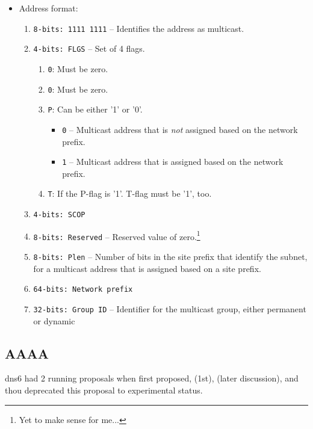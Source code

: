 \begin{itemize}
    \item Address format:\cite{IPv6Addr96:online}
    \begin{enumerate}
        \item \texttt{8-bits: 1111 1111} -- Identifies the address as multicast.
        \item \texttt{4-bits: FLGS} -- Set of 4 flags.
        \begin{enumerate}
            \item \texttt{0}: Must be zero.
            \item \texttt{0}: Must be zero.
            \item \texttt{P}: Can be either '1' or '0'.
            \begin{itemize}
                \item \texttt{0} -- Multicast address that is \textit{not} assigned based on the network prefix.
                \item \texttt{1} -- Multicast address that is assigned based on the network prefix.
            \end{itemize}
            \item \texttt{T}: If the P-flag is '1'. T-flag must be '1', too.
        \end{enumerate}
        \item \texttt{4-bits: SCOP}
        \item \texttt{8-bits: Reserved} -- Reserved value of zero.\footnote{Yet to make sense for me...}
        \item \texttt{8-bits: Plen} -- Number of bits in the site prefix that identify the subnet, for a multicast address that is assigned based on a site prefix.
        \item \texttt{64-bits: Network prefix}
        \item \texttt{32-bits: Group ID} -- Identifier for the multicast group, either permanent or dynamic
    \end{enumerate}
\end{itemize}

\subsection{AAAA}

\gls{dns6} had 2 running proposals when first proposed,  (1st),  (later discussion), and  thou deprecated this proposal to experimental status.

